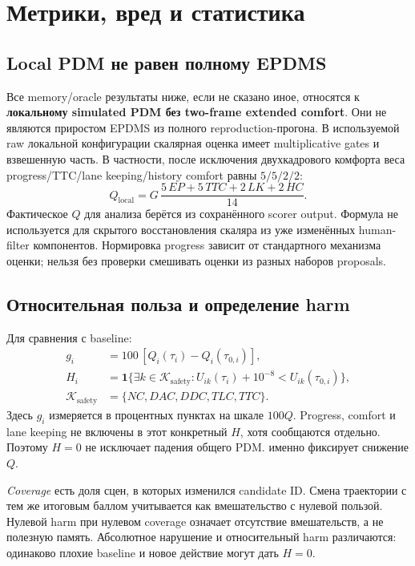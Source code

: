 \documentclass[11pt,a4paper]{article}
\newcommand{\code}[1]{\texttt{\detokenize{#1}}}
\begin{document}
\section{Метрики, вред и статистика}
\subsection{Local PDM не равен полному EPDMS}
Все memory/oracle результаты ниже, если не сказано иное, относятся к \textbf{локальному simulated PDM без two-frame extended comfort}. Они не являются приростом EPDMS из полного reproduction-прогона. В используемой raw локальной конфигурации скалярная оценка имеет multiplicative gates и взвешенную часть. В частности, после исключения двухкадрового комфорта веса progress/TTC/lane keeping/history comfort равны $5/5/2/2$:
\begin{equation}
 Q_{\mathrm{local}}=G\,\frac{5\,EP+5\,TTC+2\,LK+2\,HC}{14}.
\end{equation}
Фактическое $Q$ для анализа берётся из сохранённого scorer output. Формула не используется для скрытого восстановления скаляра из уже изменённых human-filter компонентов. Нормировка progress зависит от стандартного механизма оценки; нельзя без проверки смешивать оценки из разных наборов proposals.

\subsection{Относительная польза и определение harm}
Для сравнения с baseline:
\begin{align}
 g_i &=100\,[Q_i(\tau_i)-Q_i(\tau_{0,i})],\\
 H_i &=\mathbf{1}\{\exists k\in\mathcal K_{\mathrm{safety}}:
 U_{ik}(\tau_i)+10^{-8}<U_{ik}(\tau_{0,i})\},\\
 \mathcal K_{\mathrm{safety}}&=\{NC,DAC,DDC,TLC,TTC\}.
\end{align}
Здесь $g_i$ измеряется в процентных пунктах на шкале $100Q$. Progress, comfort и lane keeping не включены в этот конкретный $H$, хотя сообщаются отдельно. Поэтому $H=0$ не исключает падения общего PDM. \code{quality_degraded} именно фиксирует снижение $Q$.

\emph{Coverage} есть доля сцен, в которых изменился candidate ID. Смена траектории с тем же итоговым баллом учитывается как вмешательство с нулевой пользой. Нулевой harm при нулевом coverage означает отсутствие вмешательств, а не полезную память. Абсолютное нарушение и относительный harm различаются: одинаково плохие baseline и новое действие могут дать $H=0$.
\end{document}
